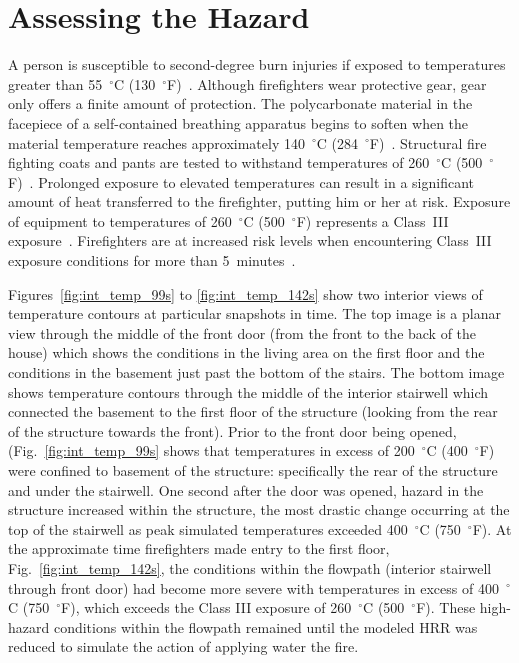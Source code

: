 \documentclass[12pt,oneside]{book}
\begin{document}
\clearpage

\section{Assessing the Hazard}
\label{assessing_hazard}
A person is susceptible to second-degree burn injuries if exposed to temperatures greater than 55~$^{\circ}$C (130~$^{\circ}$F)~\cite{contactburn}. Although firefighters wear protective gear, gear only offers a finite amount of protection. The polycarbonate material in the facepiece of a self-contained breathing apparatus begins to soften when the material temperature reaches approximately 140~$^{\circ}$C (284~$^{\circ}$F)~\cite{mensch2011emergency}. Structural fire fighting coats and pants are tested to withstand temperatures of 260~$^{\circ}$C (500~$^{\circ}$F)~\cite{nfpa2013standard}. Prolonged exposure to elevated temperatures can result in a significant amount of heat transferred to the firefighter, putting him or her at risk. Exposure of equipment to temperatures of 260~$^{\circ}$C (500~$^{\circ}$F) represents a Class~III exposure~\cite{Donnelly2006}. Firefighters are at increased risk levels when encountering Class~III exposure conditions for more than 5~minutes~\cite{Donnelly2006}.

Figures~\ref{fig:int_temp_99s} to \ref{fig:int_temp_142s} show two interior views of temperature contours at particular snapshots in time. The top image is a planar view through the middle of the front door (from the front to the back of the house) which shows the conditions in the living area on the first floor and the conditions in the basement just past the bottom of the stairs. The bottom image shows temperature contours through the middle of the interior stairwell which connected the basement to the first floor of the structure (looking from the rear of the structure towards the front). Prior to the front door being opened, (Fig.~\ref{fig:int_temp_99s} shows that temperatures in excess of 200~$^{\circ}$C (400~$^{\circ}$F) were confined to basement of the structure: specifically the rear of the structure and under the stairwell. One second after the door was opened, hazard in the structure increased within the structure, the most drastic change occurring at the top of the stairwell as peak simulated temperatures exceeded 400~$^{\circ}$C (750~$^{\circ}$F). At the approximate time firefighters made entry to the first floor, Fig.~\ref{fig:int_temp_142s}, the conditions within the flowpath (interior stairwell through front door) had become more severe with temperatures in excess of 400~$^{\circ}$C (750~$^{\circ}$F), which exceeds the Class III exposure of 260~$^{\circ}$C (500~$^{\circ}$F). These high-hazard conditions within the flowpath remained until the modeled HRR was reduced to simulate the action of applying water the fire. 
\end{document}
